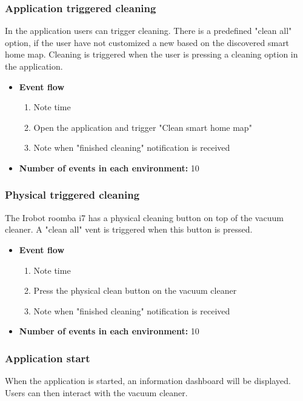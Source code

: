 \subsubsection{Application triggered cleaning}
In the application users can trigger cleaning. There is a predefined "clean all" option, if the user have not customized a new based on the discovered smart home map. Cleaning is triggered when the user is pressing a cleaning option in the application.

\begin{itemize}
    \item \textbf{Event flow} \begin{enumerate}
                                    \item Note time
                                    \item Open the application and trigger "Clean smart home map"
                                    \item Note when "finished cleaning" notification is received
                                \end{enumerate}
    \item \textbf{Number of events in each environment:} 10
\end{itemize}

\subsubsection{Physical triggered cleaning}
The Irobot roomba i7 has a physical cleaning button on top of the vacuum cleaner. A "clean all" vent is triggered when this button is pressed.

\begin{itemize}
    \item \textbf{Event flow} \begin{enumerate}
                                    \item Note time
                                    \item Press the physical clean button on the vacuum cleaner
                                    \item Note when "finished cleaning" notification is received
                                \end{enumerate}
    \item \textbf{Number of events in each environment:} 10
\end{itemize}

\subsubsection{Application start}
When the application is started, an information dashboard will be displayed. Users can then interact with the vacuum cleaner. 

